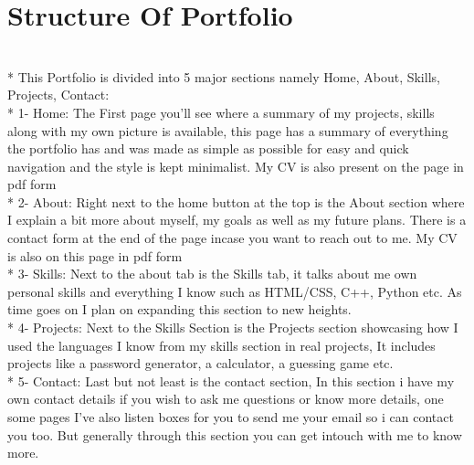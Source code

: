 \documentclass{turabian}
\begin{document}
\section{\large Structure Of Portfolio}\\*
This Portfolio is divided into 5 major sections namely Home, About, Skills, Projects, Contact:\\*
1- Home: The First page you'll see where a summary of my projects, skills along with my own picture is available, this page has a summary of everything the portfolio has and was made as simple as possible for easy and quick navigation and the style is kept minimalist. My CV is also present on the page in pdf form\\*
2- About: Right next to the home button at the top is the About section where I explain a bit more about myself, my goals as well as my future plans. There is a contact form at the end of the page incase you want to reach out to me. My CV is also on this page in pdf form\\* 
3- Skills: Next to the about tab is the Skills tab, it talks about me own personal skills and everything I know such as HTML/CSS, C++, Python etc. As time goes on I plan on expanding this section to new heights.\\*
4- Projects: Next to the Skills Section is the Projects section showcasing how I used the languages I know from my skills section in real projects, It includes projects like a password generator, a calculator, a guessing game etc.\\*
5- Contact: Last but not least is the contact section, In this section i have my own contact details if you wish to ask me questions or know more details, one some pages I've also listen boxes for you to send me your email so i can contact you too. But generally through this section you can get intouch with me to know more. 
\end{document}
